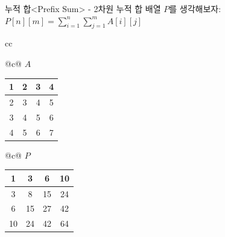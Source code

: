 \begin{frame}{누적 합}{<Prefix Sum> - 2차원 누적 합}
  배열 $P$를 생각해보자: $P[n][m] = \sum\limits_{i=1}^{n}\sum\limits_{j=1}^{m} A[i][j]$
  \vspace{5mm}
  \begin{center}
    \begin{tabular}{cc}
      \begin{tabular}{@{}c@{}}
        {\aloharegular $A$}\\[1mm]
        \begin{tabular}{|c|c|c|c|}
          \hline
          1 & 2 & 3 & 4 \\ \hline
          2 & 3 & 4 & 5 \\ \hline
          3 & 4 & 5 & 6 \\ \hline
          4 & 5 & 6 & 7 \\ \hline
        \end{tabular}
      \end{tabular}
      \hspace{18mm}
      \begin{tabular}{@{}c@{}}
        {\aloharegular $P$}\\[1mm]
        \begin{tabular}{|c|c|c|c|}
          \hline
          1  & 3  & 6  & 10 \\ \hline
          3  & 8  & 15 & 24 \\ \hline
          6  & 15 & 27 & 42 \\ \hline
          10 & 24 & 42 & 64 \\ \hline
        \end{tabular}
      \end{tabular}
    \end{tabular}
  \end{center}
\end{frame}

